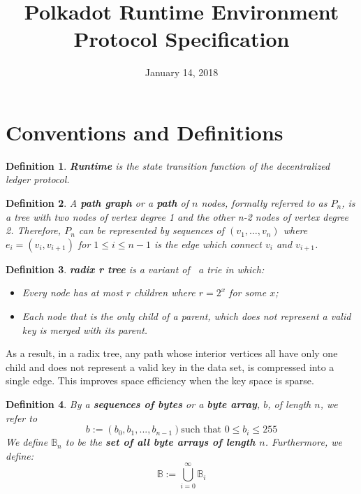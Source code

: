 \documentclass{article}
\newcommand{\assign}{:=}
\newcommand{\tmstrong}[1]{\textbf{#1}}
\newcommand{\tmtextbf}[1]{{\bfseries{#1}}}
\newtheorem{definition}{Definition}
\providecommand{\tmstrong}[1]{\tmtextbf{#1}}
\providecommand{\tmtextbf}[1]{\tmtextbf{#1}}
\newtheorem{definition}{Definition}
\begin{document}
\title{
  Polkadot Runtime Environment\\
  {\Large Protocol Specification}
}

\date{January 14, 2018}

\maketitle

\section{Conventions and Definitions}

\begin{definition}
  {\tmstrong{Runtime}} is the state transition function of the decentralized
  ledger protocol.
\end{definition}

\begin{definition}
  \label{def-path-graph}A {\tmstrong{path graph}} or a {\tmstrong{path}} of
  $n$ nodes, formally referred to as {\tmstrong{$P_n$}}, is a tree with two
  nodes of vertex degree 1 and the other n-2 nodes of vertex degree 2.
  Therefore, $P_n$ can be represented by sequences of $(v_1, \ldots, v_n)$
  where $e_i = (v_i, v_{i + 1})$ for $1 \leqslant i \leqslant n - 1$ is the
  edge which connect $v_i$ and $v_{i + 1}$.
\end{definition}

\begin{definition}
  \label{def-radix-tree}{\tmstrong{radix r tree}} is a variant of \ a trie in
  which:
  \begin{itemize}
    \item Every node has at most $r$ children where $r = 2^x$ for some $x$;
    
    \item Each node that is the only child of a parent, which does not
    represent a valid key is merged with its parent.
  \end{itemize}
\end{definition}

As a result, in a radix tree, any path whose interior vertices all have only
one child and does not represent a valid key in the data set, is compressed
into a single edge. This improves space efficiency when the key space is
sparse.

\begin{definition}
  By a {\tmstrong{sequences of bytes}} or a {\tmstrong{byte array}}, $b$, of
  length $n$, we refer to
  \[ b \assign (b_0, b_1, ..., b_{n - 1})  \text{such that } 0 \leqslant b_i
     \leqslant 255 \]
  We define $\mathbb{B}_n$ to be the {\tmstrong{set of all byte arrays of
  length $n$}}. Furthermore, we define:
  \[ \mathbb{B} \assign \bigcup^{\infty}_{i = 0} \mathbb{B}_i \]
\end{definition}
\end{document}
